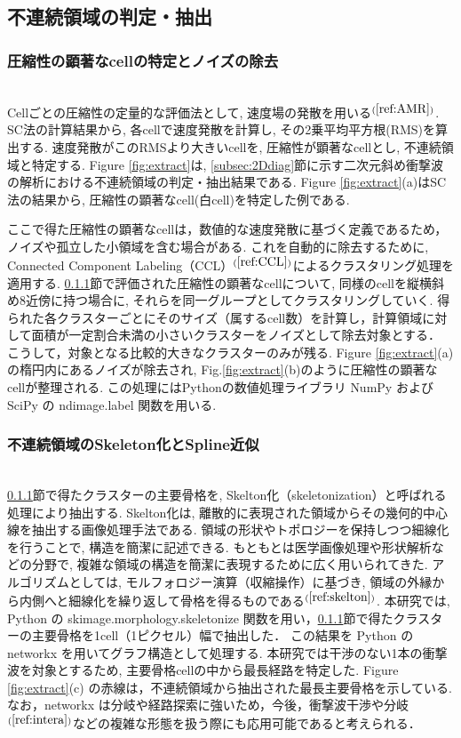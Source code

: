 \documentclass[a4j]{jarticle}
\begin{document}
\subsection{不連続領域の判定・抽出} \label{subsec:discon}

\subsubsection{圧縮性の顕著なcellの特定とノイズの除去} \label{subsubsec:comp}
\mbox{}\\[-3.0ex] 

Cellごとの圧縮性の定量的な評価法として, 速度場の発散を用いる$^{(\ref{ref:AMR})}$.
SC法の計算結果から, 各cellで速度発散を計算し, その2乗平均平方根(RMS)を算出する.
速度発散がこのRMSより大きいcellを, 圧縮性が顕著なcellとし, 不連続領域と特定する.
Figure \ref{fig:extract}は, \ref{subsec:2Ddiag}節に示す二次元斜め衝撃波の解析における不連続領域の判定・抽出結果である.
Figure \ref{fig:extract}(a)はSC法の結果から, 圧縮性の顕著なcell(白cell)を特定した例である.

ここで得た圧縮性の顕著なcellは，数値的な速度発散に基づく定義であるため，ノイズや孤立した小領域を含む場合がある.
これを自動的に除去するために, Connected Component Labeling（CCL）$^{(\ref{ref:CCL})}$によるクラスタリング処理を適用する.
\ref{subsubsec:comp}節で評価された圧縮性の顕著なcellについて, 同様のcellを縦横斜め8近傍に持つ場合に, それらを同一グループとしてクラスタリングしていく.
得られた各クラスターごとにそのサイズ（属するcell数）を計算し，計算領域に対して面積が一定割合未満の小さいクラスターをノイズとして除去対象とする．
こうして，対象となる比較的大きなクラスターのみが残る.
Figure \ref{fig:extract}(a)の楕円内にあるノイズが除去され, Fig.\ref{fig:extract}(b)のように圧縮性の顕著なcellが整理される.
この処理にはPythonの数値処理ライブラリ \textsf{NumPy} および \textsf{SciPy} の \textsf{ndimage.label} 関数を用いる.
\subsubsection{不連続領域のSkeleton化とSpline近似} \label{subsubsec:skeleton}
\mbox{}\\[-3.0ex] 

\ref{subsubsec:comp}節で得たクラスターの主要骨格を, Skelton化（skeletonization）と呼ばれる処理により抽出する.
Skelton化は, 離散的に表現された領域からその幾何的中心線を抽出する画像処理手法である. 
領域の形状やトポロジーを保持しつつ細線化を行うことで, 構造を簡潔に記述できる.
もともとは医学画像処理や形状解析などの分野で, 複雑な領域の構造を簡潔に表現するために広く用いられてきた.
アルゴリズムとしては, モルフォロジー演算（収縮操作）に基づき, 領域の外縁から内側へと細線化を繰り返して骨格を得るものである$^{(\ref{ref:skelton})}$.
本研究では, \textsf{Python} の \textsf{skimage.morphology.skeletonize} 関数を用い，\ref{subsubsec:comp}節で得たクラスターの主要骨格を1cell（1ピクセル）幅で抽出した．
この結果を \textsf{Python} の \textsf{networkx} を用いてグラフ構造として処理する.
本研究では干渉のない1本の衝撃波を対象とするため, 主要骨格cellの中から最長経路を特定した.
Figure \ref{fig:extract}(c) の赤線は，不連続領域から抽出された最長主要骨格を示している.
なお，\textsf{networkx} は分岐や経路探索に強いため，今後，衝撃波干渉や分岐$^{(\ref{ref:intera})}$などの複雑な形態を扱う際にも応用可能であると考えられる．
\end{document}

